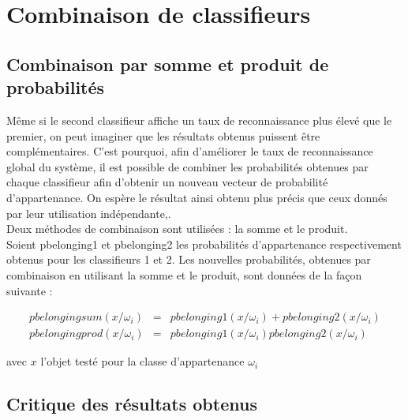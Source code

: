 \section{Combinaison de classifieurs}

\subsection{Combinaison par somme et produit de probabilités}

Même si le second classifieur affiche un taux de reconnaissance plus élevé que le premier, on peut imaginer que les résultats obtenus puissent être complémentaires. C'est pourquoi, afin d'améliorer le taux de reconnaissance global du système, il est possible de combiner les probabilités obtenues par chaque classifieur afin d'obtenir un nouveau vecteur de probabilité d'appartenance. On espère le résultat ainsi obtenu plus précis que ceux donnés par leur utilisation indépendante,.\\
Deux méthodes de combinaison sont utilisées : la somme et le produit.\\
Soient pbelonging1 et pbelonging2 les probabilités d'appartenance respectivement obtenus pour les classifieurs 1 et 2. Les nouvelles probabilités, obtenues par combinaison en utilisant la somme et le produit, sont données de la façon suivante :

$$\begin{array}{rcl}
pbelongingsum(x/\omega_i) &=& pbelonging1(x/\omega_i) + pbelonging2(x/\omega_i)\\
pbelongingprod(x/\omega_i) &=& pbelonging1(x/\omega_i)pbelonging2(x/\omega_i)
\end{array}$$

avec $x$ l'objet testé pour la classe d'appartenance $\omega_i$


\subsection{Critique des résultats obtenus}


